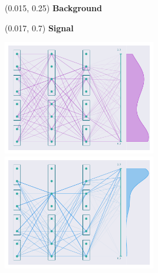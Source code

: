 \documentclass[UKenglish]{beamer}
\begin{document}
\begin{frame}
    \begin{textblock}{0.8}(0.015, 0.25)
        \textbf{Background}
    \end{textblock}
    \begin{textblock}{0.8}(0.017, 0.7)
        \textbf{Signal}
    \end{textblock}
    \begin{center}\vspace{-0.5cm}
        \includegraphics[width = 0.5\textwidth]{figures/NetworkVis/AfterTrainingBkg.pdf}
        \includegraphics[width = 0.5\textwidth]{figures/NetworkVis/AfterTrainingSig.pdf}
    \end{center}
\end{frame}
\end{document}
